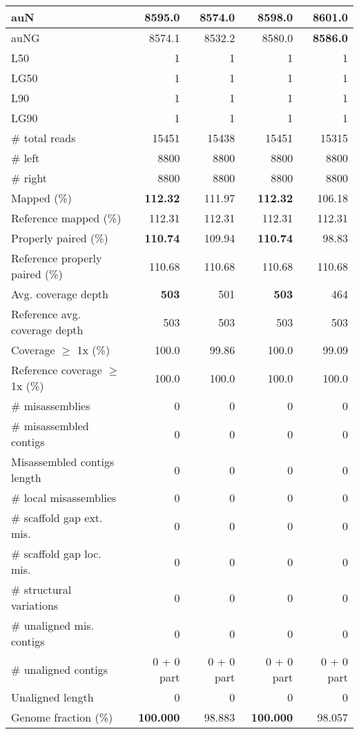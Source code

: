\documentclass[12pt,a4paper]{article}
\begin{document}
\begin{table}[ht]
\begin{center}
\begin{tabular}{|l*{4}{|r}|}
auN & 8595.0 & 8574.0 & 8598.0 & {\bf 8601.0} \\ \hline
auNG & 8574.1 & 8532.2 & 8580.0 & {\bf 8586.0} \\ \hline
L50 & 1 & 1 & 1 & 1 \\ \hline
LG50 & 1 & 1 & 1 & 1 \\ \hline
L90 & 1 & 1 & 1 & 1 \\ \hline
LG90 & 1 & 1 & 1 & 1 \\ \hline
\# total reads & 15451 & 15438 & 15451 & 15315 \\ \hline
\# left & 8800 & 8800 & 8800 & 8800 \\ \hline
\# right & 8800 & 8800 & 8800 & 8800 \\ \hline
Mapped (\%) & {\bf 112.32} & 111.97 & {\bf 112.32} & 106.18 \\ \hline
Reference mapped (\%) & 112.31 & 112.31 & 112.31 & 112.31 \\ \hline
Properly paired (\%) & {\bf 110.74} & 109.94 & {\bf 110.74} & 98.83 \\ \hline
Reference properly paired (\%) & 110.68 & 110.68 & 110.68 & 110.68 \\ \hline
Avg. coverage depth & {\bf 503} & 501 & {\bf 503} & 464 \\ \hline
Reference avg. coverage depth & 503 & 503 & 503 & 503 \\ \hline
Coverage $\geq$ 1x (\%) & 100.0 & 99.86 & 100.0 & 99.09 \\ \hline
Reference coverage $\geq$ 1x (\%) & 100.0 & 100.0 & 100.0 & 100.0 \\ \hline
\# misassemblies & 0 & 0 & 0 & 0 \\ \hline
\# misassembled contigs & 0 & 0 & 0 & 0 \\ \hline
Misassembled contigs length & 0 & 0 & 0 & 0 \\ \hline
\# local misassemblies & 0 & 0 & 0 & 0 \\ \hline
\# scaffold gap ext. mis. & 0 & 0 & 0 & 0 \\ \hline
\# scaffold gap loc. mis. & 0 & 0 & 0 & 0 \\ \hline
\# structural variations & 0 & 0 & 0 & 0 \\ \hline
\# unaligned mis. contigs & 0 & 0 & 0 & 0 \\ \hline
\# unaligned contigs & 0 + 0 part & 0 + 0 part & 0 + 0 part & 0 + 0 part \\ \hline
Unaligned length & 0 & 0 & 0 & 0 \\ \hline
Genome fraction (\%) & {\bf 100.000} & 98.883 & {\bf 100.000} & 98.057 \\ \hline

\end{tabular}
\end{center}
\end{table}
\end{document}
